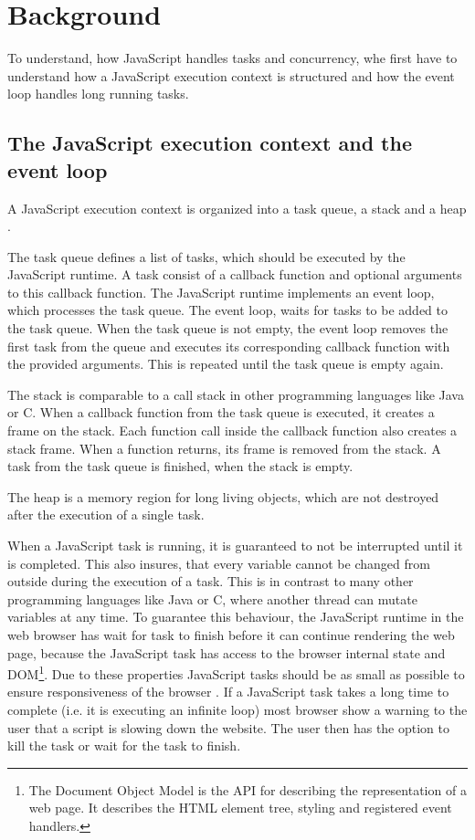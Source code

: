 \documentclass[
	ngerman,
	ruledheaders=section,%
	class=report,%
	thesis={type=bachelor},%
	accentcolor=9c,%
	custommargins=true,%
	marginpar=false,%
	parskip=half-,%
	fontsize=11pt,%
]{tudapub}
\begin{document}
  
  \newpage
  \chapter{Background}

  To understand, how JavaScript handles tasks and concurrency, whe first have to understand how a JavaScript execution context is structured and how the event loop handles long running tasks.

  \section{The JavaScript execution context and the event loop}

  A JavaScript execution context is organized into a task queue, a stack and a heap \cite{mdn-event-loop}.

  The task queue defines a list of tasks, which should be executed by the JavaScript runtime. A task consist of a callback function and optional arguments to this callback function. The JavaScript runtime implements an event loop, which processes the task queue. The event loop, waits for tasks to be added to the task queue. When the task queue is not empty, the event loop removes the first task from the queue and executes its corresponding callback function with the provided arguments. This is repeated until the task queue is empty again.

  The stack is comparable to a call stack in other programming languages like Java or C. When a callback function from the task queue is executed, it creates a frame on the stack. Each function call inside the callback function also creates a stack frame. When a function returns, its frame is removed from the stack. A task from the task queue is finished, when the stack is empty.

  The heap is a memory region for long living objects, which are not destroyed after the execution of a single task.

  When a JavaScript task is running, it is guaranteed to not be interrupted until it is completed. This also insures, that every variable cannot be changed from outside during the execution of a task. This is in contrast to many other programming languages like Java or C, where another thread can mutate variables at any time. To guarantee this behaviour, the JavaScript runtime in the web browser has wait for task to finish before it can continue rendering the web page, because the JavaScript task has access to the browser internal state and DOM\footnote{The Document Object Model is the API for describing the representation of a web page. It describes the HTML element tree, styling and registered event handlers.}. Due to these properties JavaScript tasks should be as small as possible to ensure responsiveness of the browser \cite{chrome-rail-model}. If a JavaScript task takes a long time to complete (i.e. it is executing an infinite loop) most browser show a warning to the user that a script is slowing down the website. The user then has the option to kill the task or wait for the task to finish.
\end{document}
